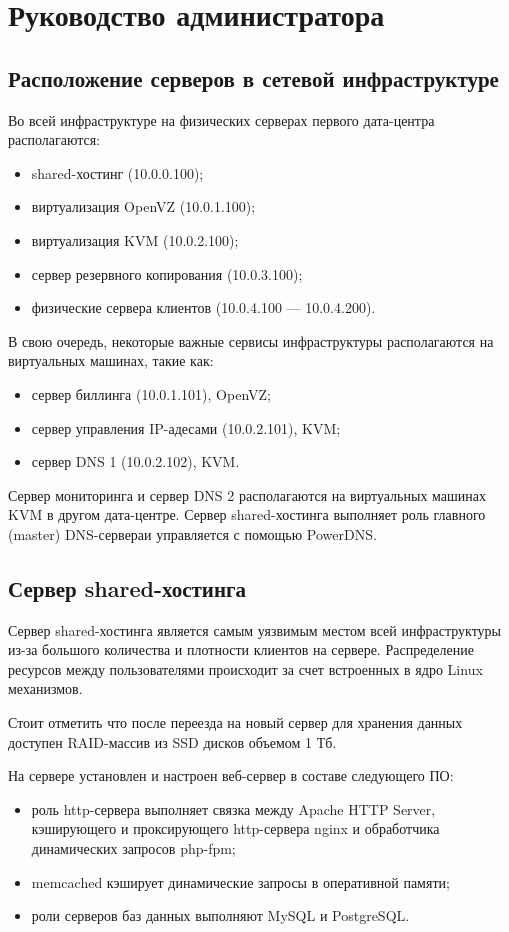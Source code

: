 \section{Руководство администратора}

\subsection{Расположение серверов в сетевой инфраструктуре}
Во всей инфраструктуре на физических серверах первого дата-центра располагаются:
\begin{itemize}
  \item shared-хостинг (10.0.0.100);
  \item виртуализация OpenVZ (10.0.1.100);
  \item виртуализация KVM (10.0.2.100);
  \item сервер резервного копирования (10.0.3.100);
  \item физические сервера клиентов (10.0.4.100 --- 10.0.4.200).
\end{itemize}

В свою очередь, некоторые важные сервисы инфраструктуры располагаются на виртуальных машинах, такие как:
\begin{itemize}
  \item сервер биллинга (10.0.1.101), OpenVZ;
  \item сервер управления IP-адесами (10.0.2.101), KVM;
  \item сервер DNS 1 (10.0.2.102), KVM.
\end{itemize}

Сервер мониторинга и сервер DNS 2 располагаются на виртуальных машинах KVM в другом дата-центре.
Сервер shared-хостинга выполняет роль главного (master) DNS-сервераи управляется с помощью PowerDNS.

\subsection{Сервер shared-хостинга}

Сервер shared-хостинга является самым уязвимым местом всей инфраструктуры из-за большого количества и плотности клиентов на сервере.
Распределение ресурсов между пользователями происходит за счет встроенных в ядро Linux механизмов.

Стоит отметить что после переезда на новый сервер для хранения данных доступен RAID-массив из SSD дисков объемом 1 Тб.

На сервере установлен и настроен веб-сервер в составе следующего ПО:
\begin{itemize}
  \item роль http-сервера выполняет связка между Apache HTTP Server, кэширующего и проксирующего http-сервера nginx и обработчика динамических запросов php-fpm;
  \item memcached кэширует динамические запросы в оперативной памяти;
  \item роли серверов баз данных выполняют MySQL и PostgreSQL.
\end{itemize}

